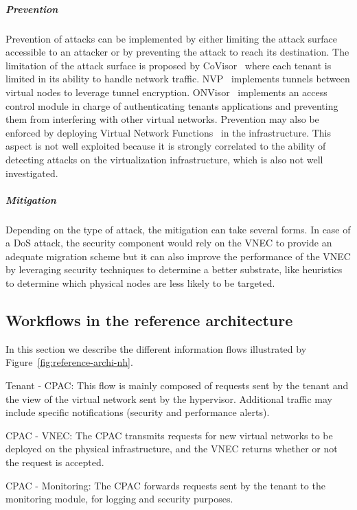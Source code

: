 \subparagraph{Prevention}
Prevention of attacks can be implemented by either limiting the attack surface accessible to an attacker or by preventing the attack to reach its destination. The limitation of the attack surface is proposed by CoVisor~\cite{CoVisor-Jin2015} where each tenant is limited in its ability to handle network traffic.
NVP~\cite{NVP-Koponen2014} implements tunnels between virtual nodes to leverage tunnel encryption.
ONVisor~\cite{ONVisor-Han2018} implements an access control module in charge of authenticating tenants applications and preventing them from interfering with other virtual networks.
Prevention may also be enforced by deploying Virtual Network Functions~\cite{vnf} in the infrastructure. This aspect is not well exploited because it is strongly correlated to the ability of detecting attacks on the virtualization infrastructure, which is also not well investigated. 

\subparagraph{Mitigation}
Depending on the type of attack, the mitigation can take several forms. 
In case of a DoS attack, the security component would rely on the VNEC to provide an adequate migration scheme but it can also improve the performance of the VNEC by leveraging security techniques to determine a better substrate, like heuristics to determine which physical nodes are less likely to be targeted. 

\subsection{Workflows in the reference architecture}
In this section we describe the different information flows illustrated by Figure~\ref{fig:reference-archi-nh}.

 Tenant - CPAC: This flow is mainly composed of requests sent by the tenant and the view of the virtual network sent by the hypervisor. Additional traffic may include specific notifications (\eg security and performance alerts).

 CPAC - VNEC: The CPAC transmits requests for new virtual networks to be deployed on the physical infrastructure, and the VNEC returns whether or not the request is accepted.

 CPAC - Monitoring: The CPAC forwards requests sent by the tenant to the monitoring module, for logging and security purposes. 

